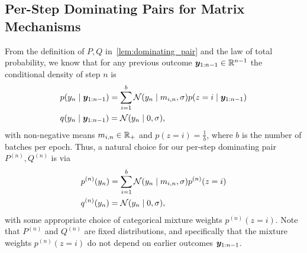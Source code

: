 \documentclass{article}
\theoremstyle{plain}
\theoremstyle{definition}
\theoremstyle{remark}
\begin{document}
\subsection{Per-Step Dominating Pairs for Matrix Mechanisms}\label{section:per_step_dominating_pairs}
From the definition of $P, Q$ in~\cref{lem:dominating_pair} and the law of total probability, we know that for any previous outcome ${\bm{y}}_{1:n-1} \in {\mathbb{R}}^{n-1}$ the conditional density of step $n$ is 
\begin{align*}
    &
    p(y_n \mid {\bm{y}}_{1:n-1}) = \sum_{i=1}^b \mathcal{N}({y}_n \mid {m}_{i,n}, \sigma) p(z=i \mid {\bm{y}}_{1:n-1})
    \\
    &
    q(y_n \mid {\bm{y}}_{1:n-1}) = \mathcal{N}({y}_n \mid 0, \sigma),
\end{align*}
with non-negative means ${m}_{i,n} \in {\mathbb{R}}_+$ and 
$p(z=i) = \frac{1}{b}$, where $b$ is the number of batches per epoch.
Thus, a natural choice for our per-step dominating pair $P^{(n)}, Q^{(n)}$ is via 
\begin{align}
    &
    p^{(n)}(y_n) = \sum_{i=1}^b \mathcal{N}({y}_n \mid {m}_{i,n}, \sigma) p^{(n)}(z=i) \label{eq:per_step_dominating_p}
    \\
    &
    q^{(n)}(y_n) = \mathcal{N}({y}_n \mid 0, \sigma), \label{eq:per_step_dominating_q}
\end{align}
with some appropriate choice of categorical mixture weights $p^{(n)}(z=i)$.
Note that $P^{(n)}$ and $Q^{(n)}$ are fixed distributions, and specifically that the mixture weights $p^{(n)}(z=i)$ do not 
depend on earlier outcomes ${\bm{y}}_{1:n-1}$.
\end{document}
